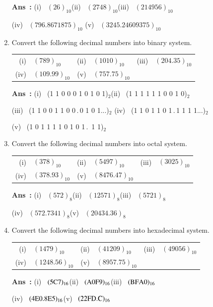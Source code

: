 \begin{enumerate}
\medskip
{\bf Ans~:} (i)~ $(26)_{10}$\hfil (ii)~ $(2748)_{10}$\hfil (iii)~ $(214956)_{10}$\hfil 

\qquad (iv)~ $(796.8671875)_{10}$\qquad\!\!\! (v)~ $(3245.24609375)_{10}$

\item Convert the following decimal numbers into binary system.

\smallskip
\begin{tabular}{r@{\;}l@{\qquad}r@{\;}l@{\qquad}r@{\;}l}
(i) & $(789)_{10}$ & (ii) & $(1010)_{10}$ & (iii) & $(204.35)_{10}$\\[5pt]
(iv) & $(109.99)_{10}$ & (v) & $(757.75)_{10}$
\end{tabular}

\medskip
{\bf Ans~:} (i)~ (1 1 0 0 0 1 0 1 0 1)$_{2}$\hfil (ii)~ (1 1 1 1 1 1 0 0 1 0)$_{2}$

\qquad (iii)~ (1 1 0 0 1 1 0 0\,.\,0 1 0 1...)$_{2}$\hfil\!\!\!\!\!\! (iv)~ (1 1 0 1 1 0 1\,.\,1 1 1 1...)$_{2}$

\qquad (v)~ (1 0 1 1 1 1 0 1 0 1\,.\, 1 1)$_{2}$

\item Convert the following decimal numbers into octal system.

\smallskip
\begin{tabular}{r@{\;}l@{\qquad}r@{\;}l@{\qquad}r@{\;}l}
(i) & $(378)_{10}$ & (ii) & $(5497)_{10}$ & (iii) & $(3025)_{10}$\\[5pt]
(iv) & $(378.93)_{10}$ & (v) & $(8476.47)_{10}$
\end{tabular}

\medskip
{\bf Ans~:} (i)~ $(572)_{8}$\hfil (ii)~ $(12571)_{8}$\hfil (iii)~ $(5721)_{8}$

\qquad (iv)~ $(572.7341)_{8}$\qquad\qquad (v)~ $(20434.36)_{8}$

\item Convert the following decimal numbers into hexadecimal system.

\smallskip
\begin{tabular}{r@{\;}l@{\qquad}r@{\;}l@{\qquad}r@{\;}l}
(i) & $(1479)_{10}$ & (ii) & $(41209)_{10}$ & (iii) & $(49056)_{10}$\\[5pt]
(iv) & $(1248.56)_{10}$ & (v) & $(8957.75)_{10}$
\end{tabular}

\medskip
{\bf Ans~:} (i)~ $(5\textrm{C} 7)_{16}$\hfil (ii)~ $(\textrm{A} 0\textrm{F} 9)_{16}$\hfil (iii)~ $(\textrm{B}\textrm{F}\textrm{A} 0)_{16}$ 

\qquad (iv)~ $(4\textrm{E} 0.8\textrm{E} 5)_{16}$\qquad\qquad (v)~ $(22\textrm{F}\textrm{D}.\textrm{C})_{16}$


\end{enumerate}
